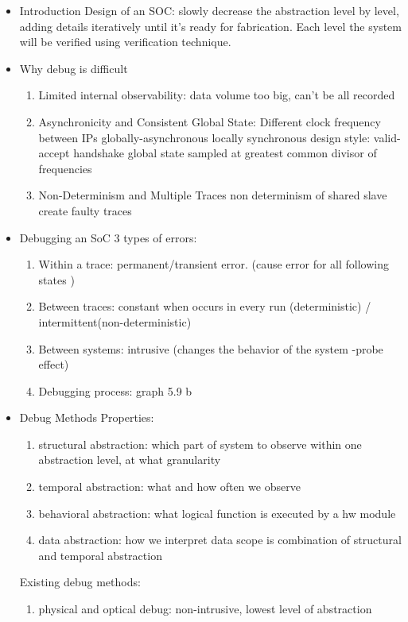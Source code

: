 \documentclass[conference]{IEEEtran}
\begin{document}
\begin{itemize}	
\item Introduction
		Design of an SOC: slowly decrease the abstraction level by level, adding details iteratively until it's ready for fabrication.
						  Each level the system will be verified using verification technique.
\item Why debug is difficult
	\begin{enumerate}
	\item Limited internal observability: data volume too big, can't be all recorded
	\item Asynchronicity and Consistent Global State: Different clock frequency between IPs
			globally-asynchronous locally synchronous design style: valid-accept handshake 
			global state sampled at greatest common divisor of frequencies
	\item Non-Determinism and Multiple Traces
			non determinism of shared slave create faulty traces
	\end{enumerate}			
\item Debugging an SoC
		3 types of errors:
		\begin {enumerate}
		\item Within a trace: permanent/transient error. (cause error for all following states )
		\item  Between traces: constant when occurs in every run (deterministic) / intermittent(non-deterministic)
		\item  Between systems: intrusive (changes the behavior of the system -probe effect)
		\item Debugging process:
			graph 5.9 b
		\end{enumerate}
\item Debug Methods
		Properties:
			\begin {enumerate}
			\item structural abstraction: which part of system to observe within one abstraction level, at what granularity
			\item temporal abstraction: what and how often we observe
			\item behavioral abstraction: what logical function is executed by a hw module
			\item data abstraction: how we interpret data
			scope is combination of structural and temporal abstraction
			\end{enumerate}
		Existing debug methods:
			\begin {enumerate}
			\item physical and optical debug: non-intrusive, lowest level of abstraction

\end{enumerate}
\end{itemize}
\end{document}
